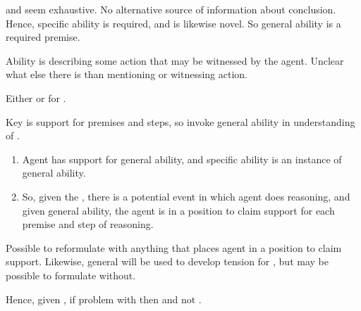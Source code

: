 \begin{note}
  \AR{} and \WR{} seem exhaustive.
  No alternative source of information about conclusion.
  Hence, specific ability is required, and is likewise novel.
  So general ability is a required premise.

  Ability is describing some action that may be witnessed by the agent.
  Unclear what else there is than mentioning or witnessing action.

  \begin{proposition}\label{either-AR-or-WR}
    Either \WR{} or \AR{} for \aben{}.
  \end{proposition}
\end{note}

\begin{note}[\WR{} alternative]
  Key is support for premises and steps, so invoke general ability in understanding of \WR{}.

  \begin{enumerate}
  \item Agent has support for general ability, and specific ability is an instance of general ability.
  \item So, given the \GSI{}, there is a potential event in which agent does reasoning, and given general ability, the agent is in a position to claim support for each premise and step of reasoning.
  \end{enumerate}

  Possible to reformulate with anything that places agent in a position to claim support.
  Likewise, general will be used to develop tension for \AR{}, but may be possible to formulate without.

  Hence, given \label{either-AR-or-WR}, if problem with \AR{} then \WR{} and not \uRa{}.
\end{note}

